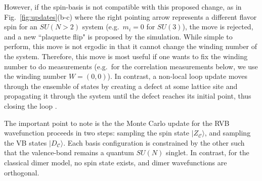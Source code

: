\documentclass[11pt]{iopart}
\begin{document}
%
However, if the spin-basis is not compatible with this proposed change, as in Fig.~\ref{fig:updates}(b-c) where the right pointing arrow represents a different flavor spin for an $SU(N>2)$ system (e.g.\ $m_i=0$ for $SU(3)$), the move is rejected, and a new ``plaquette flip" is proposed by the simulation.
%
While simple to perform, this move is not ergodic in that it cannot change the winding number of the system.
%
Therefore, this move is most useful if one wants to fix the winding number to do measurements (e.g.\ for the correlation measurements below, we use the winding number $W=(0,0)$).
%
In contrast, a non-local loop update moves through the ensemble of states by creating a defect at some lattice site and propagating it through the system until the defect reaches its initial point, thus closing the loop \cite{sandvik2010loop}.
%

The important point to note is the the Monte Carlo update for the RVB wavefunction proceeds in two steps: sampling the spin state $|Z_{\mathcal C} \rangle$, and sampling the VB states $|D_{\mathcal C} \rangle$.  Each basis configuration is constrained by the other such that the valence-bond remains a quantum $SU(N)$ singlet.  In contrast, for the classical dimer model, no spin state exists, and dimer wavefunctions are orthogonal.
\end{document}
